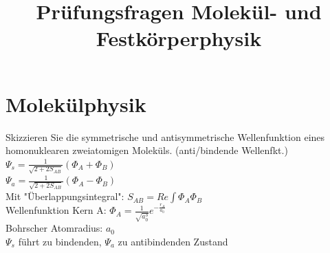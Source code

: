 \documentclass[a5paper,12pt,ngerman,print,grid=front]{kartei}
\title{Prüfungsfragen Molekül- und Festkörperphysik}
\begin{document}
\section*{Molekülphysik}



	\begin{karte}{
		Skizzieren Sie die symmetrische und antisymmetrische Wellenfunktion eines 
		homonuklearen zweiatomigen Moleküls. (anti/bindende Wellenfkt.)
		}
		$\Psi_s=\frac{1}{\sqrt{2+2S_{AB}}}(\Phi_A+\Phi_B)$ \\
		
		$\Psi_a=\frac{1}{\sqrt{2+2S_{AB}}}(\Phi_A-\Phi_B)$ \\
		
		Mit "Überlappungsintegral": $S_{AB}=Re \int \Phi_A \Phi_B$ \\
		
		Wellenfunktion Kern A: $ \Phi_A= \frac{1}{\sqrt{a_0^3}}e^{-\frac{r_A}{a_0}}$ \\
		
		Bohrscher Atomradius: $a_0$ \\
		
		$\Psi_s$ führt zu bindenden, $\Psi_a$ zu antibindenden Zustand
		
	\end{karte}
\end{document}
